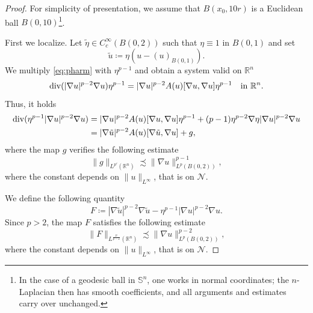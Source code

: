 \documentclass[12pt]{amsart}
\def\S{{\mathbb S}}
\renewcommand{\div}{{\rm div}}
\newcommand{\R}{\mathbb{R}}
\numberwithin{theorem}{section} \numberwithin{equation}{section}
\newcommand{\aleq}{\precsim}
\begin{document}
\begin{proof}
For simplicity of presentation, we assume that $B(x_0,10r)$ is a Euclidean ball $B(0,10)$\footnote{In the case of a geodesic ball in $\S^n$, one works in normal coordinates; the $n$-Laplacian then has smooth coefficients, and all arguments and estimates carry over unchanged.}.

First we localize. Let $\tilde{\eta} \in C_c^\infty(B(0,2))$ such that $\eta \equiv 1$ in $B(0,1)$ and set 
\[
 \tilde{u} \coloneqq \eta (u-(u)_{B(0,1)}).
\]
We multiply \eqref{eq:pharm} with $\eta^{p-1}$ and obtain a system valid on $\R^n$
\[
 \div(|\nabla u|^{p-2} \nabla u)\eta^{p-1} = |\nabla u|^{p-2} A(u)[\nabla u,\nabla u]\eta^{p-1} \quad \text{in $\R^n$}.
\]
Thus, it holds
\begin{equation}\label{eq:cutoff_syst}
\begin{split}
 \div(\eta^{p-1} |\nabla u|^{p-2} \nabla u) 
 &= |\nabla u|^{p-2} A(u)[\nabla u,\nabla u]\eta^{p-1} + (p-1) \eta^{p-2} \nabla \eta |\nabla u|^{p-2} \nabla u\\
 & = |\nabla \tilde{u}|^{p-2} A(u)[\nabla \tilde{u},\nabla u] + g,\\
 \end{split}
\end{equation} 
where the map $g$ verifies the following estimate
\begin{equation}\label{eq:estimateong}
 \|g\|_{L^{p'}(\R^n)} \aleq \|\nabla u\|_{L^p(B(0,2))}^{p-1},
\end{equation}
where the constant depends on $\|u\|_{L^\infty}$, that is on $\mathcal N$.

We define the following quantity
\[
 F\coloneqq |\nabla \tilde{u}|^{p-2} \nabla \tilde{u}- \eta^{p-1} |\nabla u|^{p-2} \nabla u .
\]
Since $p > 2$, the map $F$ satisfies the following estimate
\begin{equation}\label{eq:estimateonF}
 \|F\|_{L^{\frac{p}{p-2}}(\R^n)} \aleq \|\nabla u\|_{L^p(B(0,2))}^{p-2},
\end{equation}
where the constant depends on $\|u\|_{L^\infty}$, that is on $\mathcal N$.


\end{proof}
\end{document}
